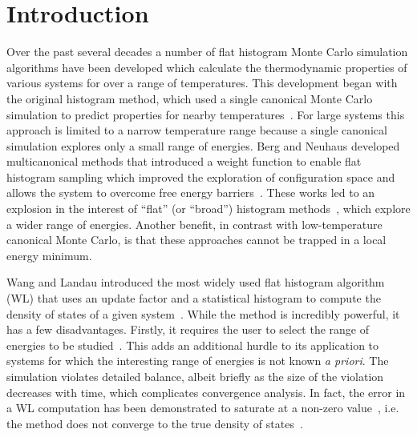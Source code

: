 \documentclass[letterpaper,twocolumn,amsmath,amssymb,pre,aps,10pt]{revtex4-1}
\begin{document}
\section{Introduction}
Over the past several decades a number of flat histogram Monte Carlo simulation
algorithms have been developed which calculate the thermodynamic properties of
various systems for over a range of temperatures.  This development began with
the original histogram method, which used a single canonical Monte Carlo
simulation to predict properties for nearby
temperatures~\cite{ferrenberg1988new}.  For large systems this approach is
limited to a narrow temperature range because a single canonical simulation
explores only a small range of energies. Berg and Neuhaus developed multicanonical
methods that introduced a weight function to enable flat histogram sampling
which improved the exploration of configuration space and allows the system
to
overcome free energy barriers~\cite{berg1991multicanonical, berg1992multicanonical}.
These works led to an explosion in the interest of
``flat'' (or
``broad'') histogram methods~\cite{penna1996broad, penna1998broad,
swendsen1999transition, wang2001determining, wang2001efficient, landau2004new, schulz2003avoiding, yan2003fast,
trebst2004optimizing,
belardinelli2007wang, belardinelli2007fast,
belardinelli2008analysis, belardinelli2014intrinsic, singh2012density, zhou2008optimal,
schneider2017convergence, liang2006theory, liang2007stochastic,
kim2006statistical,
kim2007statistical, kim2009replica, junghans2014molecular}, which explore a wider range of energies.  Another
benefit, in contrast with low-temperature canonical Monte Carlo, is that these
approaches cannot be trapped in a local energy minimum.


Wang and Landau introduced the most widely used flat histogram algorithm (WL)
that uses an update factor and a statistical histogram to compute the density of
states of a given system~\cite{wang2001determining, wang2001efficient}.  While
the method is incredibly powerful, it has a few disadvantages. Firstly, it
requires the user to select the range of energies to be
studied~\cite{landau2004new, wang2001efficient, schulz2003avoiding, yan2003fast}. This adds an additional hurdle to its application
to systems for which the interesting range of energies is not known \emph{a
priori}.  The simulation violates detailed balance, albeit briefly as the size of
the violation decreases with time, which complicates convergence analysis.  In
fact, the error in a WL computation has been demonstrated to saturate
at a non-zero value~\cite{yan2003fast}, i.e. the method does not converge to the
true density of states~\cite{belardinelli2007wang, belardinelli2007fast,
belardinelli2008analysis, belardinelli2014intrinsic, singh2012density, zhou2008optimal}.
%
\end{document}
